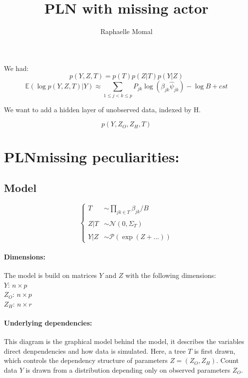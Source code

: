 \documentclass[11pt,a4paper]{article}
\author{Raphaelle Momal}
\title{PLN with missing actor}
\newcommand{\edgeunit}{1.5}
\newcommand{\Esp}{\mathds{E}}
\begin{document}
\maketitle


We had: 
$$ p(Y,Z,T) = p(T)p(Z|T)p(Y|Z)$$
$$ \Esp(\log p(Y,Z,T)|Y) \approx \sum_{1 \leq j < k \leq p} P_{jk} \log\left(\beta_{jk} \hat{\psi}_{jk}\right) - \log B + cst$$

We want to add a hidden layer of unobserved data, indexed by H.

$$ p(Y,Z_O,Z_H,T)$$
\section{PLNmissing peculiarities:}

\subsection{Model}

$$\left\{\begin{array}{rl}
T & \sim\prod_{jk \in T} \beta_{jk}/B \\\\
Z|T& \sim\mathcal{N}(0,\Sigma_T)\\\\
Y|Z&\sim\mathcal{P}( \exp( Z+...) )
\end{array} \right.$$

\paragraph{Dimensions:}
The model is build on matrices $Y$ and $Z$ with the following dimensions:\\
$Y$: $n\times p$\\
$Z_O$: $n\times p$\\
$Z_H$: $n\times r$


\paragraph{Underlying dependencies:} This diagram is the graphical model behind the model, it describes the variables direct denpendencies and how data is simulated. Here, a tree $T$ is first drawn, which controls the dependency structure of parameters $Z = (Z_O,Z_H)$. Count data $Y$ is drawn from a distribution depending only on observed parameters $Z_O$.
\begin{center}
\end{center}
\end{document}
